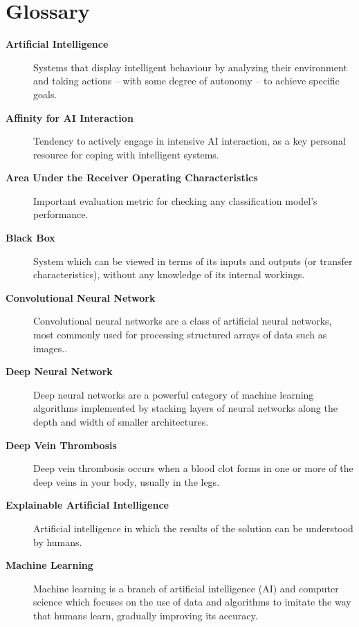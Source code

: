 {}
\chapter*{Glossary}
\begin{description}
    \item [\textbf{Artificial Intelligence}] Systems that display intelligent behaviour by analyzing their environment and taking actions – with some degree of autonomy – to achieve specific goals.
    \item [\textbf{Affinity for AI Interaction}] Tendency to actively engage in intensive AI interaction, as a key personal resource for coping with intelligent systems.
    \item [\textbf{Area Under the Receiver Operating Characteristics}] Important evaluation metric for checking any classification model’s performance.
    \item [\textbf{Black Box}] System which can be viewed in terms of its inputs and outputs (or transfer characteristics), without any knowledge of its internal workings.
    \item [\textbf{Convolutional Neural Network}] Convolutional neural networks are a class of artificial neural networks, most commonly used for processing structured arrays of data such as images..
    \item [\textbf{Deep Neural Network}] Deep neural networks are a powerful category of machine learning algorithms implemented by stacking layers of neural networks along the depth and width of smaller architectures.
    \item [\textbf{Deep Vein Thrombosis}] Deep vein thrombosis occurs when a blood clot forms in one or more of the deep veins in your body, usually in the legs.
    \item [\textbf{Explainable Artificial Intelligence}] Artificial intelligence in which the results of the solution can be understood by humans.
    \item [\textbf{Machine Learning}] Machine learning is a branch of artificial intelligence (AI) and computer science which focuses on the use of data and algorithms to imitate the way that humans learn, gradually improving its accuracy.
\end{description}
\clearpage

{}
